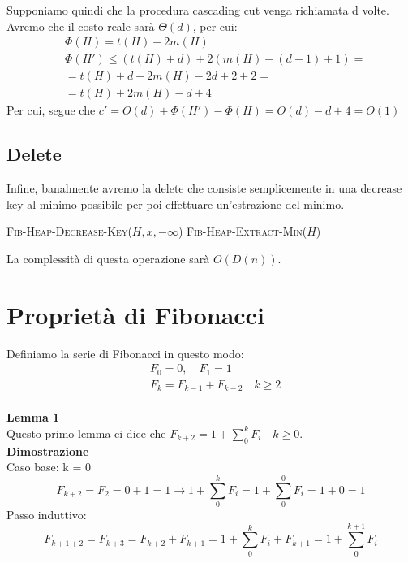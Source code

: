 Supponiamo quindi che la procedura cascading cut venga richiamata d volte. Avremo che il costo reale sarà $\Theta(d)$, per cui:
\begin{align*}
    &\Phi(H) = t(H)+2m(H)\\
    &\Phi(H') \leq (t(H)+d)+2(m(H)-(d-1)+1)=\\
    &= t(H)+d+2m(H)-2d+2+2=\\
    &= t(H)+2m(H)-d+4
\end{align*}
Per cui, segue che $c' = O(d)+\Phi(H')-\Phi(H)=O(d)-d+4=O(1)$
\subsection{Delete}
Infine, banalmente avremo la delete che consiste semplicemente in una decrease key al minimo possibile per poi effettuare un'estrazione del minimo.
\begin{algorithm}[H]
\caption{FIB-HEAP-DELETE($H, x$)}
\begin{algorithmic}[1]
    \State \textsc{Fib-Heap-Decrease-Key}($H, x, -\infty$)
    \State \textsc{Fib-Heap-Extract-Min}($H$)
\end{algorithmic}
\end{algorithm}

La complessità di questa operazione sarà $O(D(n))$.

\section{Proprietà di Fibonacci}
Definiamo la serie di Fibonacci in questo modo:
\begin{align*}
    &F_0 = 0,\quad F_1 = 1\\
    &F_k = F_{k-1}+F_{k-2} \quad k\geq 2\\
\end{align*}

\textbf{Lemma 1}\\
Questo primo lemma ci dice che $F_{k+2} = 1+ \sum_{0}^{k}F_i \quad k\geq0$.\\
\textbf{Dimostrazione}\\
Caso base: k = 0
\[F_{k+2}=F_2=0+1=1 \xrightarrow{} 1+\sum_{0}^{k}F_i = 1+ \sum_{0}^{0}F_i=1+0=1\]
Passo induttivo: \\
\[F_{k+1+2}=F_{k+3}=F_{k+2}+F_{k+1}=1+\sum_{0}^{k}F_i+F_{k+1}=1+\sum_{0}^{k+1}F_i\]

